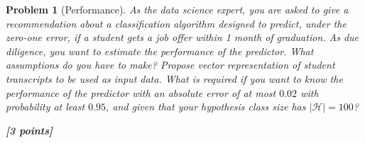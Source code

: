 \documentclass[11pt]{article}
\newtheorem{problem}{Problem}
\newcommand{\point}[1]{\hfill {\bf [#1 points]}}
\newif\ifsolutions
\newcommand{\solution}[1]{
\ifsolutions
\smallskip
\par
\noindent\emph{Solution: } #1
\fi
}
\begin{document}
\solution{
    $$\theta(s) = S_+ = max\big\{0, s\big\}, \eta = 0.1$$ 
    forward propogation:
    $$a = 0 + x_1*w_{1a} + x_2*w_{2a} = 0 + 16*0.125 + 8*0.75 = 8$$
    $$x^1_1 = \theta(a) = max\big\{0,8\big\} = 8$$
    $$b = 0 + x_1*w_{1b} + x_2*w_{2b} = 0 + 16*0.5 + 8*0.25 = 10$$
    $$x^1_2 = \theta(b) = max\big\{0,10\big\} = 10$$
    $$c = 0 + x^1_1*w_{ac} + x^1_2*w_{bc} = 0 + 8*0.5 + 10*0.1 = 5$$
    $$h(x) = x^2_c = \theta(c) = max\big\{0,5\big\} = 5$$
    backpropogation:
    $$\frac{\partial e(\textbf{w})}{\partial w_{bc}} = \frac{\partial e(\textbf{w})}{\partial c}*\frac{\partial c}{\partial w_bc}$$
    $$\frac{\partial c}{\partial w_bc}=x^1_2 = 10, \frac{\partial e(\textbf{w})}{\partial c} = \delta c$$
    $$e(\textbf w)=\frac{1}{2}\big(\theta(c)-y\big)^2$$
    $$\theta'(c) = 
    \begin{cases}
        0\quad(c<0)\\
        1\quad(c>=0)
    \end{cases}$$
    $$\delta c = \frac{\partial e(\textbf w)}{\partial \theta(c)}*\frac{\partial \theta(c)}{\partial c} = \big(\theta(c) - y\big)*1 = 5 - 7 = -2$$
    $$\frac{\partial e(\textbf w)}{w_{bc}} = -2 * 10 = -20$$ 
    $$w'_{bc} = w_{bc} - \eta * \frac{\partial e(\textbf w)}{w_{bc}} = 0.1 - 0.1 * (-20) = 2.1$$
}

\begin{problem}[Performance]\em
As the data science expert, you are asked to give a recommendation about a classification algorithm designed to predict, under the zero-one error, if a student gets a job offer within 1 month of graduation. As due diligence, you want to estimate the performance of the predictor. What assumptions do you have to make? Propose  vector representation of student transcripts to be used as input data. What is required if you want to know the performance of the predictor with an absolute error of at most $0.02$ with probability at least $0.95$, and given that your hypothesis class size has $\mathcal{|H|}=100$? 

\point{3}

\solution{ 

[Present your solution here...]

}
\end{problem}
\end{document}
